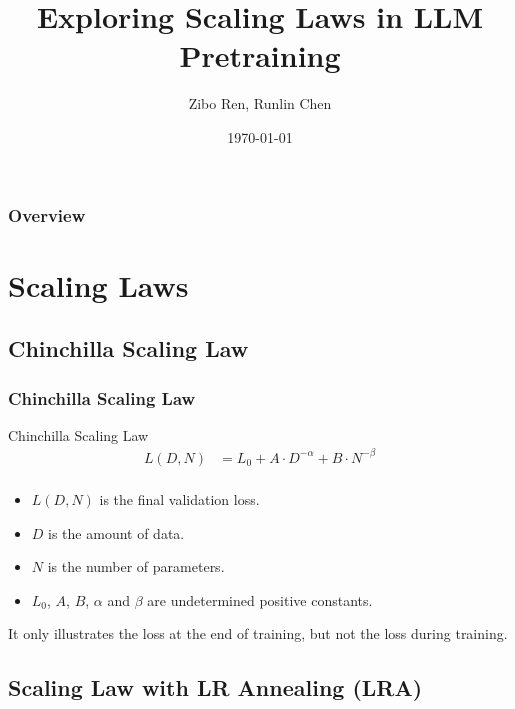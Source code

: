 \documentclass[aspectratio=169]{beamer}
\title[Scaling Laws]{
    Exploring Scaling Laws in LLM Pretraining
}
\author{Zibo Ren, Runlin Chen}
\institute[PKU]
{
    Peking University \\
    \medskip
    \texttt{\{2200010626,2200010848\}@stu.pku.edu.cn}
}
\date{\today}
\begin{document}
    \begin{frame}
        \titlepage
    \end{frame}

    \begin{frame}
        \frametitle{Overview}
        \tableofcontents
    \end{frame}


    \section{Scaling Laws}\label{sec:scalinglaws}

    \subsection{Chinchilla Scaling Law}\label{subsec:chinchilla}
    \begin{frame}
        \frametitle{Chinchilla Scaling Law}
        \begin{block}{Chinchilla Scaling Law}
            \begin{equation}
                \label{eq:chinchilla}
                \begin{aligned}
                    L(D, N) &= L_0 + A\cdot D^{-\alpha} + B\cdot N^{-\beta} \\
                \end{aligned}
            \end{equation}
        \end{block}
        \begin{itemize}
            \item $L(D, N)$ is the final validation loss.
            \item $D$ is the amount of data.
            \item $N$ is the number of parameters.
            \item $L_0$, $A$, $B$, $\alpha$ and $\beta$ are undetermined
            positive constants.
        \end{itemize}

        It only illustrates the loss at the end of training, but not the
        loss during training.
    \end{frame}

    \subsection{Scaling Law with LR Annealing (LRA)}\label{subsec:LRA}
\end{document}
